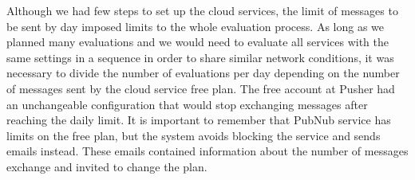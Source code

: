 Although we had few steps to set up the cloud services, the limit of messages to be sent by day imposed limits to the whole evaluation process.
As long as we planned many evaluations and we would need to evaluate all services with the same settings in a sequence in order to share similar network conditions, it was necessary to divide the number of evaluations per day depending on the number of messages sent by the cloud service free plan.
The free account at Pusher had an unchangeable configuration that would stop exchanging messages after reaching the daily limit.
It is important to remember that PubNub service has limits on the free plan, but the system avoids blocking the service and sends emails instead.
These emails contained information about the number of messages exchange and invited to change the plan.























